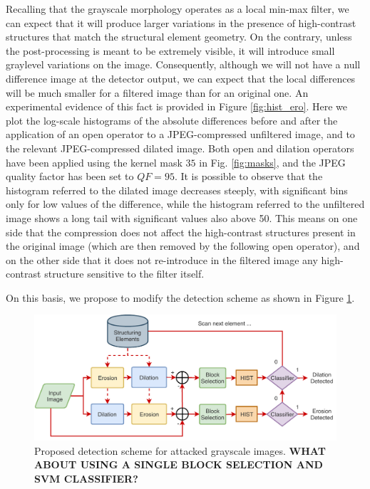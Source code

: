 \documentclass[review]{elsarticle}
\begin{document}
Recalling that the grayscale morphology operates as a local min-max filter, we can expect that it will produce larger variations in the presence of high-contrast structures that match the structural element geometry. On the contrary, unless the post-processing is meant to be extremely visible, it will introduce small graylevel variations on the image. Consequently, although we will not have a null difference image at the detector output, we can expect that the local differences will be much smaller for a filtered image than for an original one. An experimental evidence of this fact is provided in Figure \ref{fig:hist_ero}. Here we plot the log-scale histograms of the absolute differences before and after the application of an open operator to a JPEG-compressed unfiltered image, and to the relevant JPEG-compressed dilated image. Both open and dilation operators have been applied using the kernel mask $35$ in Fig. \ref{fig:masks}, and the JPEG quality factor has been set to $QF=95$. It is possible to observe that the histogram referred to the dilated image decreases steeply, with significant bins only for low values of the difference, while the histogram referred to the unfiltered image shows a long tail with significant values also above 50. This means on one side that the compression does not affect the high-contrast structures present in the original image (which are then removed by the following open operator), and on the other side that it does not re-introduce in the filtered image any high-contrast structure sensitive to the filter itself.

On this basis, we propose to modify the detection scheme as shown in Figure \ref{fig:scheme_improved}.

\begin{figure}[!ht]
	\centering
	\includegraphics[width=0.8\linewidth]{diagram2}
	\caption{Proposed detection scheme for attacked grayscale images. \textbf{WHAT ABOUT USING A SINGLE BLOCK SELECTION AND SVM CLASSIFIER?}}
	\label{fig:scheme_improved}
\end{figure}
\end{document}

